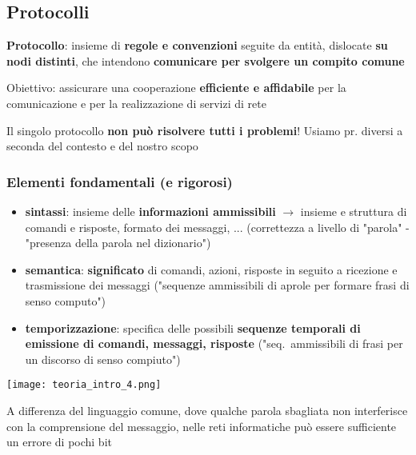 \subsection{Protocolli}

\textbf{Protocollo}: insieme di \textbf{regole e convenzioni} seguite da entit\`a, dislocate \textbf{su nodi distinti}, che intendono \textbf{comunicare per svolgere un compito comune}

Obiettivo: assicurare una cooperazione \textbf{efficiente e affidabile} per la comunicazione e per la realizzazione di servizi di rete

\begin{emphasize}
    Il singolo protocollo \textbf{non pu\`o risolvere tutti i problemi}! Usiamo pr. diversi a seconda del contesto e del nostro scopo
\end{emphasize}

\subsubsection{Elementi fondamentali (e rigorosi)}

\begin{minipage}[c]{.6\textwidth}
\begin{itemize}
  \item \textbf{sintassi}: insieme delle \textbf{informazioni ammissibili} $\rightarrow$ insieme e struttura di comandi e risposte, formato dei messaggi, ... (correttezza a livello di "parola" - "presenza della parola nel dizionario")
  \item \textbf{semantica}: \textbf{significato} di comandi, azioni, risposte in seguito a ricezione e trasmissione dei messaggi ("sequenze ammissibili di aprole per formare frasi di senso computo")
  \item \textbf{temporizzazione}: specifica delle possibili \textbf{sequenze temporali di emissione di comandi, messaggi, risposte} ("seq.~ammissibili di frasi per un discorso di senso compiuto")
\end{itemize}
\end{minipage}
\begin{minipage}[c]{.4\textwidth}
\texttt{[image: teoria\_intro\_4.png]}
\end{minipage}


\begin{emphasize}
  A differenza del linguaggio comune, dove qualche parola sbagliata non interferisce con la comprensione del messaggio, nelle reti informatiche pu\`o essere sufficiente un errore di pochi bit
\end{emphasize}

